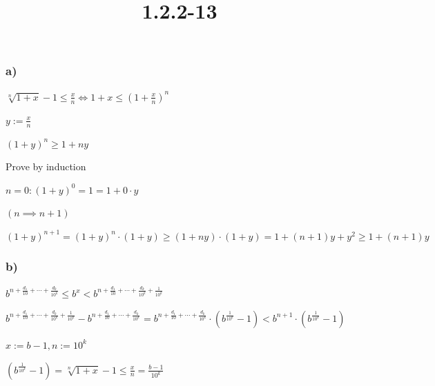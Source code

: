 \documentclass{article}
\title{1.2.2-13}
\begin{document}
\maketitle

\subsubsection*{a)}

\( \sqrt[n]{1+x} - 1 \leq \frac{x}{n} \iff 1+x \leq (1+\frac{x}{n})^n \)

\( y := \frac{x}{n} \)

\( (1+y)^n \geq 1 + ny \)

Prove by induction

\( n = 0: (1+y)^0=1=1+0\cdot y \)

\( (n \implies n + 1) \)

\( (1+y)^{n+1} = (1+y)^n \cdot (1+y) \geq (1+ny)\cdot(1+y)=1+(n+1)y+y^2 \geq 1+(n+1)y \)

\subsubsection*{b)}

\( b^{n+\frac{d_1}{10}+\cdots+\frac{d_k}{10^k}} \leq b^x < b^{n+\frac{d_1}{10}+\cdots+\frac{d_k}{10^k} + \frac{1}{10^k}} \)

\( b^{n+\frac{d_1}{10}+\cdots+\frac{d_k}{10^k} + \frac{1}{10^k}} - b^{n+\frac{d_1}{10}+\cdots+\frac{d_k}{10^k}} = b^{n+\frac{d_1}{10}+\cdots+\frac{d_k}{10^k}} \cdot (b^{\frac{1}{10^k}} - 1) < b^{n+1} \cdot (b^{\frac{1}{10^k}} - 1) \)

\( x := b - 1, n := 10^k \)

\( (b^{\frac{1}{10^k}} - 1) = \sqrt[n]{1+x} - 1 \leq \frac{x}{n} = \frac{b-1}{10^k} \)
\end{document}
